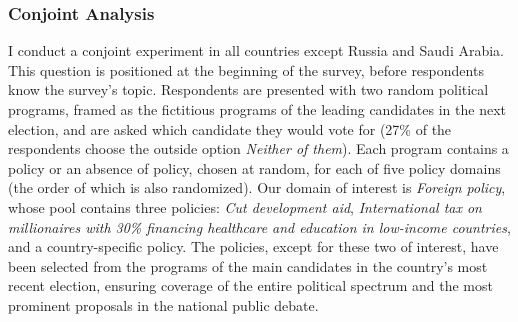 \documentclass[12pt,english]{article}
\begin{document}
\begin{bibunit}
\subsubsection{Conjoint Analysis}\label{subsec:conjoint}

I conduct a conjoint experiment in all countries except Russia and Saudi Arabia. This question is positioned at the beginning of the survey, before respondents know the survey's topic. Respondents are presented with two random political programs, framed as the fictitious programs of the leading candidates in the next election, and are asked which candidate they would vote for (27\% of the respondents choose the outside option \textit{Neither of them}). Each program contains a policy or an absence of policy, chosen at random, for each of five policy domains (the order of which is also randomized). %
Our domain of interest is \textit{Foreign policy}, whose pool contains three policies: \textit{Cut development aid}, \textit{International tax on millionaires with 30\% financing healthcare and education in low-income countries}, and a country-specific policy. %
The policies, except for these two of interest, have been selected from the programs of the main candidates in the country's most recent election, ensuring coverage of the entire political spectrum and the most prominent proposals in the national public debate. 


\end{bibunit}
\end{document}
